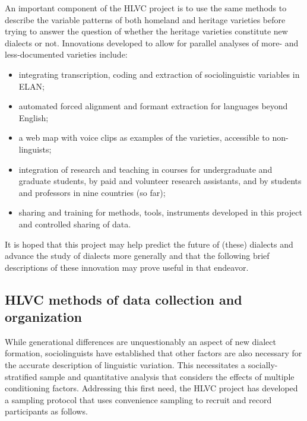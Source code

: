 \documentclass[output=paper]{LSP/langsci}
\begin{document}
An important component of the HLVC project is to use the same methods to describe the variable patterns of both homeland and heritage varieties before trying to answer the question of whether the heritage varieties constitute new dialects or not. Innovations developed to allow for parallel analyses of more- and less-documented varieties include: 

\begin{itemize}
\item integrating transcription, coding and extraction of sociolinguistic variables in ELAN; 

\item automated forced alignment and formant extraction for languages beyond English; 

\item a web map with voice clips as examples of the varieties, accessible to non-linguists; 

\item integration of research and teaching in courses for undergraduate and graduate students, by paid and volunteer research assistants, and by students and professors in nine countries (so far); %

\item sharing and training for methods, tools, instruments developed in this project and controlled sharing of data. 
\end{itemize}

It is hoped that this project may help predict the future of (these) dialects and advance the study of dialects more generally and that the following brief descriptions of these innovation may prove useful in that endeavor.

\subsection{HLVC methods of data collection and organization}

While generational differences are unquestionably an aspect of new dialect formation, sociolinguists have established that other factors are also necessary for the accurate description of linguistic variation. This necessitates a socially-strat\-i\-fied sample and quantitative analysis that considers the effects of multiple conditioning factors. Addressing this first need, the HLVC project has developed a sampling protocol that uses convenience sampling to recruit and record participants as follows.
\end{document}
